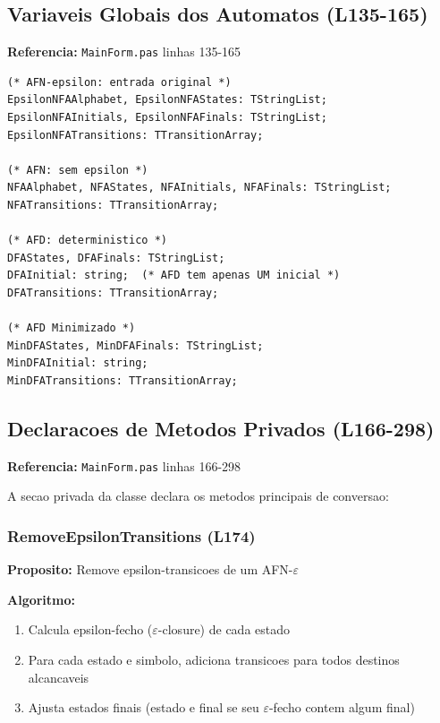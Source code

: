 \documentclass[12pt,a4paper]{article}
\begin{document}
\subsection{Variaveis Globais dos Automatos (L135-165)}

\textbf{Referencia:} \texttt{MainForm.pas} linhas 135-165

\begin{lstlisting}[style=pascal, caption={Variaveis Globais}]
(* AFN-epsilon: entrada original *)
EpsilonNFAAlphabet, EpsilonNFAStates: TStringList;
EpsilonNFAInitials, EpsilonNFAFinals: TStringList;
EpsilonNFATransitions: TTransitionArray;

(* AFN: sem epsilon *)
NFAAlphabet, NFAStates, NFAInitials, NFAFinals: TStringList;
NFATransitions: TTransitionArray;

(* AFD: deterministico *)
DFAStates, DFAFinals: TStringList;
DFAInitial: string;  (* AFD tem apenas UM inicial *)
DFATransitions: TTransitionArray;

(* AFD Minimizado *)
MinDFAStates, MinDFAFinals: TStringList;
MinDFAInitial: string;
MinDFATransitions: TTransitionArray;
\end{lstlisting}

\subsection{Declaracoes de Metodos Privados (L166-298)}

\textbf{Referencia:} \texttt{MainForm.pas} linhas 166-298

A secao privada da classe declara os metodos principais de conversao:

\subsubsection{RemoveEpsilonTransitions (L174)}

\textbf{Proposito:} Remove epsilon-transicoes de um AFN-$\varepsilon$

\textbf{Algoritmo:}
\begin{enumerate}
    \item Calcula epsilon-fecho ($\varepsilon$-closure) de cada estado
    \item Para cada estado e simbolo, adiciona transicoes para todos destinos alcancaveis
    \item Ajusta estados finais (estado e final se seu $\varepsilon$-fecho contem algum final)
\end{enumerate}
\end{document}
